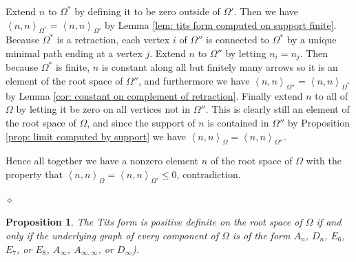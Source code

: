 \documentclass{article}
\newcommand{\bracket}[1]{\left \langle #1 \right\rangle}
\newtheorem{proposition}{Proposition}[section]
\newenvironment{proof}{\vspace*{2ex}\noindent {\em Proof:}
}{\hfill $\diamond$ \\[2ex]}
\newcommand{\hilight}[1]{\colorbox{yellow}{#1}}
\begin{document}
\begin{proof}
Extend $n$ to $\Omega^*$ by defining it to be zero outside of $\Omega'$. Then we have $\bracket{n , n}_{\Omega^*} = \bracket{n , n}_{\Omega'}$ by Lemma \ref{lem: tits form computed on support finite}. Because $\Omega^*$ is a retraction, each vertex $i$ of $\Omega''$ is connected to $\Omega^*$ by a unique minimal path ending at a vertex $j$. Extend $n$ to $\Omega''$ by letting $n_i = n_j$. Then because $\Omega^*$ is finite, $n$ is constant along all but finitely many arrows so it is an element of the root space of $\Omega''$, and furthermore we have $\bracket{n , n}_{\Omega''} = \bracket{n , n}_{\Omega^*}$ by Lemma \ref{cor: constant on complement of retraction}. Finally extend $n$ to all of $\Omega$ by letting it be zero on all vertices not in $\Omega''$. This is clearly still an element of the root space of $\Omega$, and since the support of $n$ is contained in $\Omega''$ by Proposition \ref{prop: limit computed by support} we have $\bracket{n , n}_{\Omega} = \bracket{n , n}_{\Omega''}$. 

Hence all together we have a nonzero element $n$ of the root space of $\Omega$ with the property that $\bracket{n , n}_{\Omega} = \bracket{n , n}_{\Omega'} \leq 0$, contradiction.   






\end{proof}


\begin{proposition}\label{prop: positive tits form if and only if infinite dynkin}
The Tits form is positive definite on the root space of $\Omega$ if and only if the underlying graph of every component of $\Omega$ is of the form  $A_n$, $D_n$, $E_6$, $E_7$, or $E_8$,  $A_\infty$, $A_{\infty, \infty}$, or $D_\infty$).     
\end{proposition}
\end{document}
